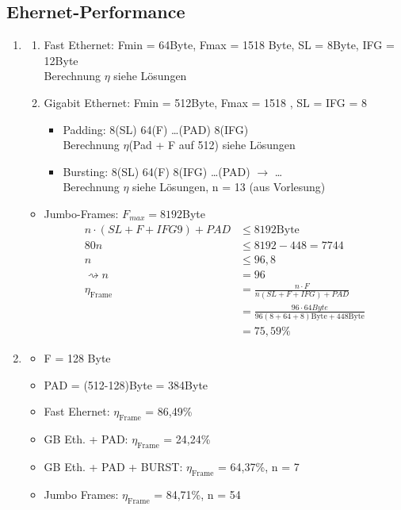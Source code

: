 \subsection{Ehernet-Performance}
\begin{enumerate}
	\item
	\begin{enumerate}
		\item Fast Ethernet: Fmin = 64Byte, Fmax = 1518 Byte, SL = 8Byte, IFG = 12Byte \\ Berechnung $\eta$ siehe Lösungen
		\item Gigabit Ethernet: Fmin = 512Byte, Fmax = 1518 , SL = IFG  = 8
		\begin{itemize}
			\item Padding: 8(SL) 64(F) \ldots(PAD) 8(IFG) \\ Berechnung $\eta$(Pad + F auf 512) siehe Lösungen
			\item Bursting: 8(SL) 64(F) 8(IFG) \ldots (PAD) $\to$ \ldots \\ Berechnung $\eta$ siehe Lösungen, n = 13 (aus Vorlesung)
		\end{itemize}
	\end{enumerate}
	\begin{itemize}
		\item Jumbo-Frames: $F_{max} = 8192$Byte
		\begin{align*}
			n\cdot (SL+F+IFG9)+PAD &\le 8192 \text{Byte}\\
			80n &\le 8192 - 448 = 7744\\
			n &\le 96,8 \\\rightsquigarrow n &= 96\\
			\eta_{\text{Frame}} &= \frac{n\cdot F}{n(SL+F+IFG)+PAD}\\
			&= \frac{96\cdot 64 Byte}{96(8+64+8)\text{Byte}+448\text{Byte}}\\
			&= 75,59\%
			\end{align*}
	\end{itemize}
	\item 
	\begin{itemize}
		\item F = 128 Byte
		\item PAD = (512-128)Byte = 384Byte
		\item Fast Ehernet: $\eta_{\text{Frame}}$ = 86,49\%
		\item GB Eth. + PAD: $\eta_{\text{Frame}}$ = 24,24\%
		\item GB Eth. + PAD + BURST: $\eta_{\text{Frame}}$ = 64,37\%, n = 7
		\item Jumbo Frames: $\eta_{\text{Frame}}$ = 84,71\%, n = 54
	\end{itemize}
\end{enumerate}

